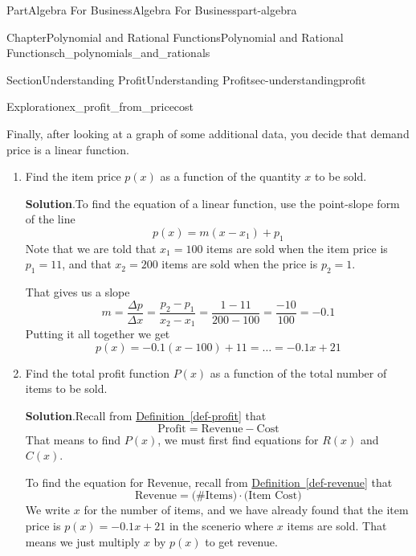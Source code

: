 \documentclass[oneside,10pt,]{tufte-book}
\newcommand{\blocktitlefont}{\relax}
\newcommand{\xreffont}{\relax}
\numberwithin{equation}{chapter}
\begin{document}
\begin{partptx}{Part}{Algebra For Business}{}{Algebra For Business}{}{}{part-algebra}
\begin{chapterptx}{Chapter}{Polynomial and Rational Functions}{}{Polynomial and Rational Functions}{}{}{ch_polynomials_and_rationals}
\begin{sectionptx}{Section}{Understanding Profit}{}{Understanding Profit}{}{}{sec-understandingprofit}
\begin{exploration}{Exploration}{}{ex_profit_from_pricecost}
\par
Finally, after looking at a graph of some additional data, you decide that demand price is a linear function.%
\begin{enumerate}[font=\bfseries,label=(\alph*),ref=\alph*]%
\item{}Find the item price \(p(x)\) as a function of the quantity \(x\) to be sold.%
\par\smallskip%
\noindent\textbf{\blocktitlefont Solution}.\hypertarget{ex_profit_from_pricecost-2-2}{}\quad{}To find the equation of a linear function, use the point-slope form of the line%
\begin{equation*}
p(x) = m (x-x_1) + p_1
\end{equation*}
Note that we are told that \(x_1=100\) items are sold when the item price is \(p_1=11\), and that \(x_2=200\) items are sold when the price is \(p_2=1\).%
\par
That gives us a slope%
\begin{equation*}
m = \dfrac{\Delta p}{\Delta x} = \dfrac{p_2-p_1}{x_2-x_1} = \dfrac{1-11}{200-100} = \dfrac{-10}{100} = -0.1
\end{equation*}
Putting it all together we get%
\begin{equation*}
p(x) = -0.1 (x-100) + 11 = \dots = -0.1x + 21
\end{equation*}
%
\item{}Find the total profit function \(P(x)\) as a function of the total number of items to be sold.%
\par\smallskip%
\noindent\textbf{\blocktitlefont Solution}.\hypertarget{ex_profit_from_pricecost-3-2}{}\quad{}Recall from \hyperref[def-profit]{Definition~{\xreffont\ref{def-profit}}} that%
\begin{equation*}
\text{Profit} = \text{Revenue} - \text{Cost}
\end{equation*}
That means to find \(P(x)\), we must first find equations for \(R(x)\) and \(C(x)\).%
\par
To find the equation for Revenue, recall from \hyperref[def-revenue]{Definition~{\xreffont\ref{def-revenue}}} that%
\begin{equation*}
\text{Revenue} = \Big(\text{\# Items}\Big) \cdot \Big(\text{Item Cost}\Big)
\end{equation*}
We write \(x\) for the number of items, and we have already found that the item price is \(p(x) = -0.1x + 21 \) in the scenerio where \(x\) items are sold.  That means we just multiply \(x\) by \(p(x)\) to get revenue.%
\begin{equation*}

\end{equation*}
\end{enumerate}
\end{exploration}
\end{sectionptx}
\end{chapterptx}
\end{partptx}
\end{document}
